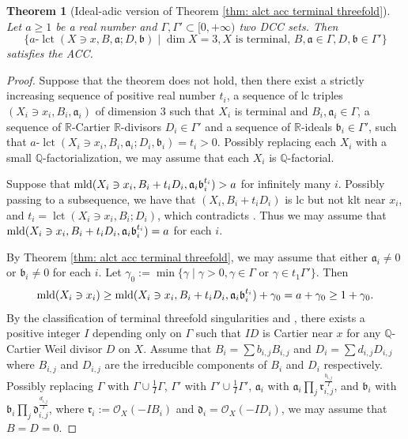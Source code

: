 \documentclass[11pt]{amsart}
\numberwithin{equation}{section}
\newcommand{\Qq}{\mathbb{Q}}
\newcommand{\Rr}{\mathbb{R}}
\newcommand{\aaa}{\mathfrak{a}}
\newcommand{\bbb}{\mathfrak{b}}
\newcommand{\ddd}{\mathfrak{d}}
\newcommand{\rrr}{\mathfrak{r}}
\newcommand{\mld}{{\rm{mld}}}
\newcommand{\lct}{\operatorname{lct}}
\newcommand{\Ii}{{\Gamma}}
\newtheorem{thm}{Theorem}[section]
\theoremstyle{definition}
\theoremstyle{definition}
\begin{document}
\begin{thm}[Ideal-adic version of Theorem \ref{thm: alct acc terminal threefold}]\label{thm: ideal-adic alct acc terminal threefold}
Let $a\geq 1$ be a real number and $\Ii,\Ii'\subset [0,+\infty)$ two DCC sets. Then
$$\{a\text{-}\lct(X\ni x,B,\aaa;D,\bbb)\mid \dim X=3, X\text{ is terminal, }B,\aaa\in\Ii,D,\bbb\in\Ii'\}$$
satisfies the ACC.
\end{thm}
\begin{proof}
Suppose that the theorem does not hold, then there exist a strictly increasing sequence of positive real number $t_i$, a sequence of lc triples $(X_i\ni x_i,B_i,\aaa_i)$ of dimension $3$ such that $X_i$ is terminal and $B_i,\aaa_i\in\Ii$, a sequence of $\Rr$-Cartier $\Rr$-divisors $D_i\in\Ii'$ and a sequence of $\Rr$-ideals $\bbb_i\in\Ii'$, such that $a\text{-}\lct(X_i\ni x_i,B_i,\aaa_i;D_i,\bbb_i)=t_i>0$. 
Possibly replacing each $X_i$ with a small $\Qq$-factorialization, we may assume that each $X_i$ is $\Qq$-factorial. 

Suppose that $\mld(X_i\ni x_i,B_i+t_iD_i,\aaa_i\bbb^{t_i}_i)>a$ for infinitely many $i$. Possibly passing to a subsequence, we have that $(X_i,B_i+t_iD_i)$ is lc but not klt near $x_i$, and $t_i=\lct(X_i\ni x_i,B_i;D_i)$, which contradicts \cite[Theorem 1.1]{HMX14}. Thus we may assume that $\mld(X_i\ni x_i,B_i+t_iD_i,\aaa_i\bbb^{t_i}_i)=a$ for each $i$.

By Theorem \ref{thm: alct acc terminal threefold}, we may assume that either $\aaa_i\not=\mathfrak{0}$ or $\bbb_i\not=\mathfrak{0}$ for each $i$. Let $\gamma_0:=\min\{\gamma\mid\gamma>0, \gamma\in\Ii\text{ or }\gamma\in t_1\Ii'\}$. Then 
$$\mld(X_i\ni x_i)\geq \mld(X_i\ni x_i,B_i+t_iD_i,\aaa_i\bbb^{t_i}_i)+\gamma_0=a+\gamma_0\geq 1+\gamma_0.$$
By the classification of terminal threefold singularities and \cite[Lemma~5.1]{Kaw88}, there exists a positive integer $I$ depending only on $\Ii$ such that $ID$ is Cartier near $x$ for any $\Qq$-Cartier Weil divisor $D$ on $X$. Assume that $B_i=\sum b_{i,j}B_{i,j}$ and $D_i=\sum d_{i,j}D_{i,j}$ where $B_{i,j}$ and $D_{i,j}$ are the irreducible components of $B_i$ and $D_i$ respectively. Possibly replacing $\Ii$ with $\Ii\cup\frac{1}{I}\Ii$, $\Ii'$ with $\Ii'\cup\frac{1}{I}\Ii'$, $\aaa_i$ with $\aaa_i\prod_j\rrr_{i,j}^{\frac{b_{i,j}}{I}}$, and $\bbb_i$ with $\bbb_i\prod_j\ddd_{i,j}^{\frac{d_{i,j}}{I}}$, where $\rrr_i:=\mathcal{O}_X(-IB_i)$ and $\ddd_i=\mathcal{O}_X(-ID_i)$, we may assume that $B=D=0$.


\end{proof}
\end{document}
